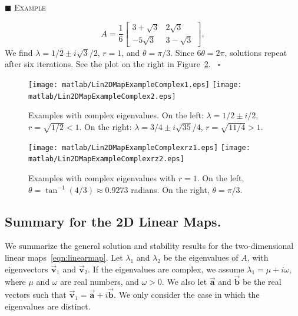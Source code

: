 \documentclass[reqno]{immbook}
\newcommand{\BA}{\vec{\textbf{a}}}
\newcommand{\BB}{\vec{\textbf{b}}}
\newcommand{\BV}{\vec{\textbf{v}}}
\numberwithin{equation}{chapter}
\numberwithin{question}{section}
\numberwithin{theorem}{chapter}
\numberwithin{figure}{chapter}
\theoremstyle{definition}
\newenvironment{xexample}%
{%

\medskip\noindent\addtocounter{example}{1}$\blacksquare$ \textsc{Example \theexample}\hspace*{1em}%
}%
{%
~\hfill$\square$

\medskip
}
\begin{document}
\begin{xexample}
\begin{equation}
A = \frac{1}{6}\begin{bmatrix} 3+\sqrt{3} & 2\sqrt{3}\\ -5\sqrt{3} &  3-\sqrt{3}\end{bmatrix},
\end{equation}
We find $\lambda = 1/2 \pm i\sqrt{3}/2$, $r = 1$, and
$\theta=\pi/3$.
Since $6\theta = 2\pi$, solutions repeat after six iterations.
See the plot on the right in Figure~\ref{fig:Lin2DMapExampleComplexrz}.
\end{xexample}



\begin{figure}
\centerline{%
\texttt{[image: matlab/Lin2DMapExampleComplex1.eps]}
\texttt{[image: matlab/Lin2DMapExampleComplex2.eps]}
}
\caption{%
Examples with complex eigenvalues.
On the left:
$\lambda = 1/2 \pm i/2$, $r = \sqrt{1/2} < 1$.
On the right:
$\lambda = 3/4 \pm i\sqrt{35}/4$, $r = \sqrt{11/4} > 1$.
}
\label{fig:Lin2DMapExampleComplex1}
\end{figure}
%
\begin{figure}
\centerline{%
\texttt{[image: matlab/Lin2DMapExampleComplexrz1.eps]}
\texttt{[image: matlab/Lin2DMapExampleComplexrz2.eps]}
}
\caption{%
Examples with complex eigenvalues with $r=1$.
On the left,
$\theta = \tan^{-1}(4/3)\approx 0.9273$ radians.
On the right,
$\theta=\pi/3$.
}
\label{fig:Lin2DMapExampleComplexrz}
\end{figure}

\newpage

\subsection*{Summary for the 2D Linear Maps.}
We summarize the general solution and stability results
for the two-dimensional linear maps~\eqref{eqn:linearmap}.
Let $\lambda_1$ and $\lambda_2$ be the eigenvalues of
$A$, with eigenvectors $\BV_1$ and $\BV_2$.
If the eigenvalues are complex, we assume
$\lambda_1 = \mu+i\omega$, where $\mu$ and $\omega$
are real numbers, and $\omega > 0$.  We also let $\BA$ and $\BB$
be the real vectors such that $\BV_1 = \BA+i\BB$.
We only consider the case in which the eigenvalues are distinct. 
\end{document}
